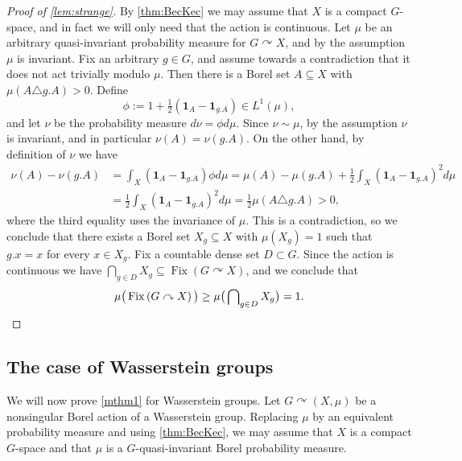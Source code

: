 \documentclass{amsart}
\numberwithin{equation}{subsection}
\theoremstyle{plain}
\theoremstyle{definition}
\theoremstyle{plain}
\begin{document}
\begin{proof}[Proof of \cref{lem:strange}]
By \cref{thm:BecKec} we may assume that \(X\) is a compact \(G\)-space, and in fact we will only need that the action is continuous. Let \(\mu\) be an arbitrary quasi-invariant probability measure for \(G\curvearrowright X\), and by the assumption \(\mu\) is invariant. Fix an arbitrary \(g\in G\), and assume towards a contradiction that it does not act trivially modulo \(\mu\). Then there is a Borel set \(A\subseteq X\) with \(\mu\left(A\triangle g.A\right)>0\). Define
\[\phi:=1+\tfrac{1}{2}\left(\mathbf{1}_{A}-\mathbf{1}_{g.A}\right)\in L^{1}\left(\mu\right),\]
and let \(\nu\) be the probability measure \(d\nu=\phi d\mu\). Since \(\nu\sim\mu\), by the assumption \(\nu\) is invariant, and in particular \(\nu\left(A\right)=\nu\left(g.A\right)\). On the other hand, by definition of \(\nu\) we have
\begin{align*}
\nu\left(A\right)-\nu\left(g.A\right)
&=\int_{X}\left(\mathbf{1}_{A}-\mathbf{1}_{g.A}\right)\phi d\mu=\mu\left(A\right)-\mu\left(g.A\right)+\frac{1}{2}\int_{X}\left(\mathbf{1}_{A}-\mathbf{1}_{g.A}\right)^{2}d\mu\\
&=\frac{1}{2}\int_{X}\left(\mathbf{1}_{A}-\mathbf{1}_{g.A}\right)^{2}d\mu=\frac{1}{2}\mu\left(A\triangle g.A\right)>0,
\end{align*}
where the third equality uses the invariance of \(\mu\). This is a contradiction, so we conclude that there exists a Borel set \(X_{g}\subseteq X\) with \(\mu\left(X_{g}\right)=1\) such that \(g.x=x\) for every \(x\in X_{g}\). Fix a countable dense set \(D\subset G\). Since the action is continuous we have \(\bigcap_{g\in D}X_{g}\subseteq\operatorname{Fix}\left(G\curvearrowright X\right)\), and we conclude that
\[\mu\big(\operatorname{Fix}\left(G\curvearrowright X\right)\big)\geq\mu\big(\bigcap\nolimits_{g\in D}X_{g}\big)=1.\qedhere\]
\end{proof}

\subsection{The case of Wasserstein groups}

We will now prove \cref{mthm1} for Wasserstein groups. Let \(G\curvearrowright\left(X,\mu\right)\) be a nonsingular Borel action of a Wasserstein group. Replacing \(\mu\) by an equivalent probability measure and using \cref{thm:BecKec}, we may assume that \(X\) is a compact \(G\)-space and that \(\mu\) is a \(G\)-quasi-invariant Borel probability measure.
\end{document}
